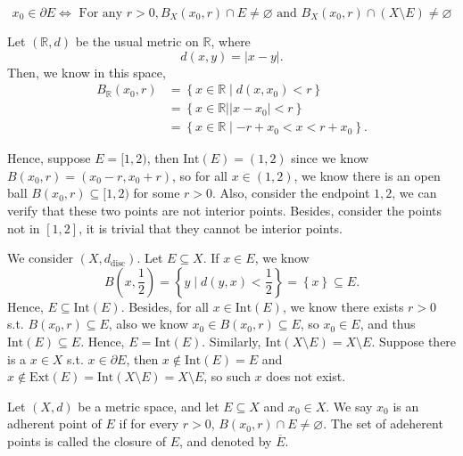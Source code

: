 \begin{proposition}
    \[
        x_0 \in \partial E \iff \text{ For any } r > 0, B_X(x_0, r) \cap E \neq \varnothing \text{ and } B_X(x_0, r) \cap (X \setminus E) \neq \varnothing 
    \]
\end{proposition}

\begin{eg}
    Let \((\mathbb{R} , d)\) be the usual metric on \(\mathbb{R} \), where 
    \[
        d(x,y) = \vert x-y \vert. 
    \]  
    Then, we know in this space,
    \begin{align*}
        B_\mathbb{R} (x_0, r) &= \left\{ x \in \mathbb{R} \mid d(x, x_0) < r \right\} \\
        &= \left\{ x \in \mathbb{R} \mid \vert x - x_0 \vert < r \right\} \\
        &= \left\{ x \in \mathbb{R} \mid -r + x_0 < x < r + x_0 \right\}.
    \end{align*}

    Hence, suppose \(E = [1, 2)\), then \(\mathrm{Int}(E) = (1,2) \) since we know \(B(x_0, r) = (x_0 - r, x_0 + r)\), so for all \(x \in (1,2)\), we know there is an open ball \(B(x_0, r) \subseteq [1, 2)\) for some \(r > 0\). Also, consider the endpoint \(1,2\), we can verify that these two points are not interior points. Besides, consider the points not in \([1, 2]\), it is trivial that they cannot be interior points.  
\end{eg}

\begin{eg}
    We consider \((X, d_{\text{disc}})\). Let \(E \subseteq X\). If \(x \in E\), we know 
    \[
        B\left( x, \frac{1}{2} \right) = \left\{ y \mid d(y,x) < \frac{1}{2} \right\} = \left\{ x \right\} \subseteq E.  
    \]   
    Hence, \(E \subseteq  \mathrm{Int}(E)  \).  Besides, for all \(x \in \mathrm{Int}(E) \), we know there exists \(r > 0\) s.t. \(B(x_0, r) \subseteq E\), also we know \(x_0 \in B(x_0, r) \subseteq E\), so \(x_0 \in E\), and thus \(\mathrm{Int}(E) \subseteq E \). Hence, \(E = \mathrm{Int}(E) \).  Similarly, \(\mathrm{Int}(X \setminus E) = X \setminus E\).  Suppose there is a \(x \in X\) s.t. \(x \in \partial E\), then \(x \notin \mathrm{Int}(E) = E\) and \(x \notin \mathrm{Ext}(E) = \mathrm{Int}(X \setminus E) = X \setminus E\), so such \(x\) does not exist.    
\end{eg}

\begin{definition}[Closure] \label{def: closure}
    Let \((X, d)\) be a metric space, and let \(E \subseteq X\) and \(x_0 \in X\). We say \(x_0\) is an adherent point of \(E\) if for every \(r > 0\), \(B(x_0, r) \cap E \neq \varnothing \). The set of adeherent points is called the closure of \(E\), and denoted by \(\overline{E} \).        
\end{definition}


